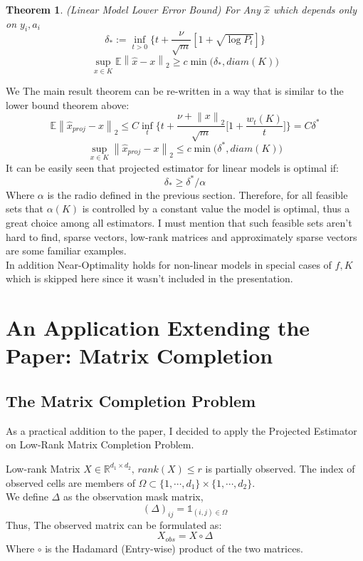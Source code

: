 \documentclass{amsart}
\newtheorem{theorem}{Theorem}[section]
\theoremstyle{definition}
\theoremstyle{remark}
\numberwithin{equation}{section}
\newcommand\norm[1]{\left\lVert#1\right\rVert}
\begin{document}
\begin{theorem} (Linear Model Lower Error Bound)
For Any $\hat{x}$ which depends only on $y_i,a_i$
\[
\delta_* := \inf_{t>0} \{ t + \frac{\nu}{\sqrt{m}} [ 1+ \sqrt{\log P_t} ] \}
\]
\[
\sup_{x\in K} \mathbb{E}\norm{\hat{x}-x}_2 \geq c \min\big(\delta_*, diam(K)\big)
\]
\end{theorem} 
We 
The main result theorem can be re-written in a way that is similar to the lower bound theorem above:
\[
\mathbb{E}\norm{\hat{x}_{proj}-x}_2 \leq C \inf_t \lbrace t + \frac{\nu + \norm{x}_2}{\sqrt{m}}\big[ 1+ \frac{w_t(K)}{t}\big] \rbrace = C \delta^*
\]
\[
\sup_{x\in K} \norm{\hat{x}_{proj}-x}_2 \leq c \min\big(\delta^*, diam(K)\big)
\]
It can be easily seen that projected estimator for linear models is optimal if:
\[\delta_* \geq \delta^*/\alpha\]
Where $\alpha$ is the radio defined in the previous section. Therefore, for all feasible sets that $\alpha(K)$ is controlled by a constant value the model is optimal, thus a great choice among all estimators. I must mention that such feasible sets aren't hard to find, sparse vectors, low-rank matrices and approximately sparse vectors are some familiar examples.\\
In addition Near-Optimality holds for non-linear models in special cases of $f,K$ which is skipped here since it wasn't included in the presentation.

\section{\textbf{An Application Extending the Paper: Matrix Completion}}

\subsection{The Matrix Completion Problem}

As a practical addition to the paper, I decided to apply the Projected Estimator on Low-Rank Matrix Completion Problem. 

Low-rank Matrix $X \in \mathbb{R}^{d_1 \times d_2}, \, rank(X)\leq r$ is partially observed. The index of observed cells are members of $\Omega \subset \{1,\cdots,d_1\}\times\{1,\cdots,d_2\} $.\\
We define $\Delta$ as the observation mask matrix,
\[
(\Delta)_{ij} = \mathbb{1}_{(i,j)\in \Omega}
\]
Thus, The observed matrix can be formulated as:
\[
X_{obs} = X \circ \Delta
\]
Where $\circ$ is the Hadamard (Entry-wise) product of the two matrices.
\end{document}
